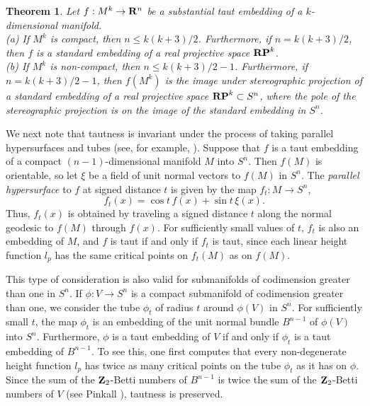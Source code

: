 \documentclass[12pt]{article}
\newtheorem{theorem}{Theorem}[section]
\begin{document}
\begin{theorem}
\label{thm:kuiper-bound-on-codimension}
Let $f:M^k \rightarrow {\bf R}^n$ be a substantial taut
embedding of a $k$-dimensional manifold.\\
{\rm (a)} If $M^k$ is compact, then $n \leq k(k+3)/2$. Furthermore, if $n = k(k+3)/2$,
then $f$ is a standard embedding of a real projective
space ${\bf RP}^k$.\\
{\rm (b)}   If $M^k$ is non-compact, then $n \leq k(k+3)/2 -1$.  Furthermore, if $n = k(k+3)/2 - 1$,
then $f(M^k)$ is the image under stereographic
projection of a standard embedding of a real projective space ${\bf RP}^k \subset S^n$, where the pole of the 
stereographic projection
is on the image of the standard embedding in $S^n$.
\end{theorem} 


We next note that tautness is invariant under the process of taking parallel hypersurfaces
and tubes (see, for example, \cite[pp. 57--58]{CR8}).
Suppose that $f$ is a taut embedding of a compact 
$(n-1)$-dimensional manifold $M$ into $S^n$.  Then
$f(M)$ is orientable, so let $\xi$ be a field of unit
normal vectors to $f(M)$ in $S^n$.  The {\em parallel
hypersurface} to $f$ at signed distance $t$ is given by
the map $f_t:M \rightarrow S^n$,
\begin{equation}
\label{eq:f_t-spherical}
f_t(x) = \cos t \,  f(x) + \sin t \, \xi (x).
\end{equation}
Thus, $f_t(x)$ is obtained by traveling a signed distance $t$
along the normal geodesic to $f(M)$ through $f(x)$.  For
sufficiently small values of $t$, $f_t$ is also an
embedding of $M$, and $f$ is taut if and only if $f_t$ is
taut, since each linear height function $l_p$
has the same critical points on $f_t(M)$ as on $f(M)$.

This type of consideration is also valid for submanifolds
of codimension greater than one in $S^n$.  If
$\phi :V \rightarrow S^n$ is a compact submanifold of
codimension greater than one, we consider the tube $\phi_t$
of radius $t$ around $\phi(V)$ in $S^n$.  For sufficiently
small $t$, the map $\phi_t$ is an embedding of the unit
normal bundle $B^{n-1}$ of $\phi(V)$ into $S^n$.
Furthermore, $\phi$ is a taut  embedding of $V$ if and only if
$\phi_t$ is a taut embedding of $B^{n-1}$.  To see this, one
first computes that every non-degenerate height function
$l_p$ has twice as many critical points on the tube $\phi_t$ as it has
on $\phi$.  Since the sum of the ${\bf Z}_2$-Betti numbers
of $B^{n-1}$ is twice the sum of the ${\bf Z}_2$-Betti numbers
of $V$ (see Pinkall \cite{P4}), tautness is preserved.
\end{document}
